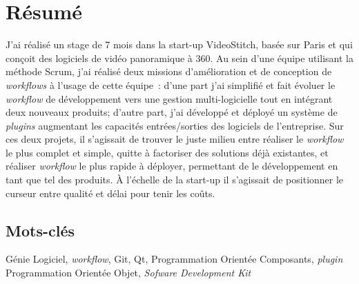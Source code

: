 \newpage
\section*{Résumé}
J'ai réalisé un stage de 7 mois dans la start-up VideoStitch, basée sur Paris et qui
conçoit des logiciels de vidéo panoramique à 360\degree. Au sein d'une équipe utilisant
la méthode Scrum, j'ai réalisé deux missions d'amélioration et de conception de
\textit{workflows} à l'usage de cette équipe~: d'une part j'ai simplifié et fait évoluer
le \textit{workflow} de développement vers une gestion multi-logicielle
tout en intégrant deux nouveaux produits; d'autre part, j'ai développé
et déployé un système de \textit{plugins} augmentant les capacités entrées/sorties
des logiciels de l'entreprise. Sur ces deux projets, il s'agissait de trouver le
juste milieu entre réaliser le \textit{workflow} le plus complet et simple, 
quitte à factoriser des solutions déjà existantes, et réaliser \textit{workflow} 
le plus rapide à déployer, permettant de le développement en tant que tel des produits. 
À l'échelle de la start-up il s'agissait de positionner le curseur entre qualité
et délai pour tenir les coûts.

\subsection*{Mots-clés}
Génie Logiciel, \textit{workflow}, Git, Qt, Programmation Orientée Composants, \textit{plugin}
Programmation Orientée Objet, \textit{Sofware Development Kit}
